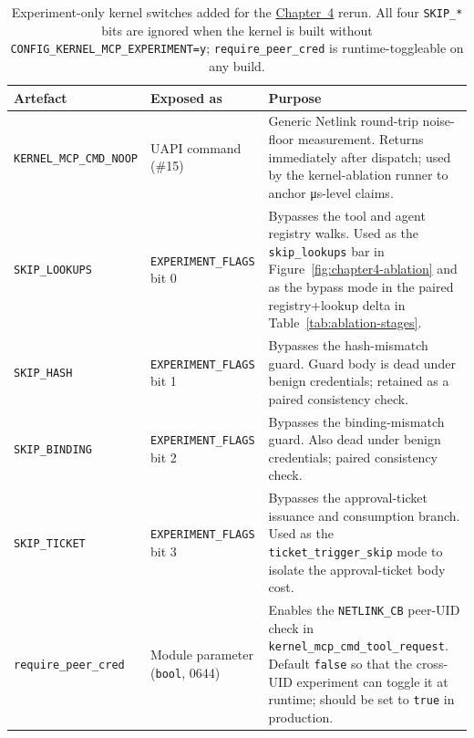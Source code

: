 \begin{table}[H]
\centering
\caption{Experiment-only kernel switches added for the \hyperref[chap:evaluation]{Chapter~4} rerun. All four \texttt{SKIP\_*} bits are ignored when the kernel is built without \texttt{CONFIG\_KERNEL\_MCP\_EXPERIMENT=y}; \texttt{require\_peer\_cred} is runtime-toggleable on any build.}
\label{tab:experiment-switches}
\footnotesize
\renewcommand{\arraystretch}{1.25}
\setlength{\tabcolsep}{6pt}
\begin{tabular}{p{3.3cm} p{3.1cm} p{7.3cm}}
\toprule
\textbf{Artefact} & \textbf{Exposed as} & \textbf{Purpose} \\
\midrule
\rowcolor{gray!8}
\texttt{KERNEL\_\allowbreak MCP\_\allowbreak CMD\_\allowbreak NOOP} & UAPI command (\#15) & Generic Netlink round-trip noise-floor measurement. Returns immediately after dispatch; used by the kernel-ablation runner to anchor μs-level claims. \\
\texttt{SKIP\_LOOKUPS} & \texttt{EXPERIMENT\_\allowbreak FLAGS} bit 0 & Bypasses the tool and agent registry walks. Used as the \texttt{skip\_lookups} bar in Figure~\ref{fig:chapter4-ablation} and as the bypass mode in the paired registry+lookup delta in Table~\ref{tab:ablation-stages}. \\
\rowcolor{gray!8}
\texttt{SKIP\_HASH} & \texttt{EXPERIMENT\_\allowbreak FLAGS} bit 1 & Bypasses the hash-mismatch guard. Guard body is dead under benign credentials; retained as a paired consistency check. \\
\texttt{SKIP\_BINDING} & \texttt{EXPERIMENT\_\allowbreak FLAGS} bit 2 & Bypasses the binding-mismatch guard. Also dead under benign credentials; paired consistency check. \\
\rowcolor{gray!8}
\texttt{SKIP\_TICKET} & \texttt{EXPERIMENT\_\allowbreak FLAGS} bit 3 & Bypasses the approval-ticket issuance and consumption branch. Used as the \texttt{ticket\_trigger\_skip} mode to isolate the approval-ticket body cost. \\
\texttt{require\_\allowbreak peer\_\allowbreak cred} & Module parameter (\texttt{bool}, 0644) & Enables the \texttt{NETLINK\_CB} peer-UID check in \texttt{kernel\_mcp\_\allowbreak cmd\_\allowbreak tool\_\allowbreak request}. Default \texttt{false} so that the cross-UID experiment can toggle it at runtime; should be set to \texttt{true} in production. \\
\bottomrule
\end{tabular}
\end{table}

